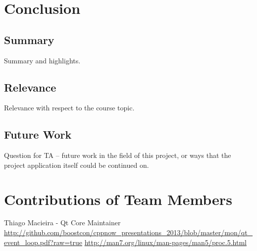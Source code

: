\documentclass[12pt]{article}
\begin{document}
	\section{Conclusion}
	
	\subsection{Summary}
	Summary and highlights.
	
	\subsection{Relevance}
	Relevance with respect to the course topic.
	
	\subsection{Future Work}
	Question for TA -- future work in the field of this project, or ways that the project application itself could be continued on.
	
	
	\setcounter{secnumdepth}{0}
	\section{Contributions of Team Members}
	
	\begin{thebibliography}{3}
	 Thiago Macieira - Qt Core Maintainer \url{http://github.com/boostcon/cppnow_presentations_2013/blob/master/mon/qt_event_loop.pdf?raw=true}
	\url{http://man7.org/linux/man-pages/man5/proc.5.html}
	\end{thebibliography}{}
\end{document}
